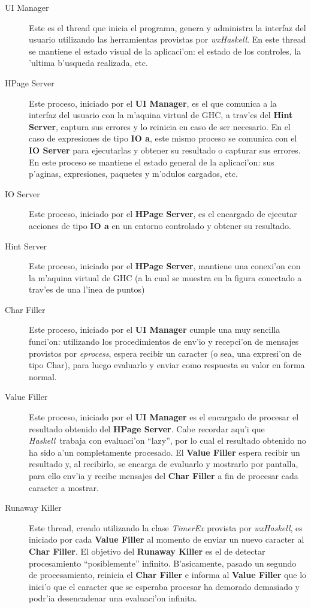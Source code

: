 \documentclass[a4paper]{article}
\newcommand{\haskell}{\textsl{Haskell}}
\begin{document}
\begin{description}
	\item[UI Manager] Este es el thread que inicia el programa, genera y administra la interfaz del usuario utilizando las herramientas provistas por \textsl{wxHaskell}.  En este thread se mantiene el estado visual de la aplicaci'on: el estado de los controles, la 'ultima b'usqueda realizada, etc.
	\item[HPage Server] Este proceso, iniciado por el \textbf{UI Manager}, es el que comunica a la interfaz del usuario con la m'aquina virtual de GHC, a trav'es del \textbf{Hint Server}, captura sus errores y lo reinicia en caso de ser necesario.  En el caso de expresiones de tipo \textbf{IO a}, este mismo proceso se comunica con el \textbf{IO Server} para ejecutarlas y obtener su resultado o capturar sus errores.  En este proceso se mantiene el estado general de la aplicaci'on: sus p'aginas, expresiones, paquetes y m'odulos cargados, etc.
	\item[IO Server]Este proceso, iniciado por el  \textbf{HPage Server}, es el encargado de ejecutar acciones de tipo \textbf{IO a} en un entorno controlado y obtener su resultado.
	\item[Hint Server] Este proceso, iniciado por el \textbf{HPage Server}, mantiene una conexi'on con la m'aquina virtual de GHC (a la cual se muestra en la figura conectado a trav'es de una l'inea de puntos)
	\item[Char Filler] Este proceso, iniciado por el \textbf{UI Manager} cumple una muy sencilla funci'on: utilizando los procedimientos de env'io y recepci'on de mensajes provistos por \textsl{eprocess}, espera recibir un caracter (o sea, una expresi'on de tipo Char), para luego evaluarlo y enviar como respuesta su valor en forma normal.
	\item[Value Filler] Este proceso, iniciado por el \textbf{UI Manager} es el encargado de procesar el resultado obtenido del \textbf{HPage Server}.  Cabe recordar aqu'i que \haskell\ trabaja con evaluaci'on ``lazy'', por lo cual el resultado obtenido no ha sido a'un completamente procesado.  El \textbf{Value Filler} espera recibir un resultado y, al recibirlo, se encarga de evaluarlo y mostrarlo por pantalla, para ello env'ia y recibe mensajes del \textbf{Char Filler} a fin de procesar cada caracter a mostrar.
	\item[Runaway Killer] Este thread, creado utilizando la clase \textsl{TimerEx} provista por \textsl{wxHaskell}, es iniciado por cada \textbf{Value Filler} al momento de enviar un nuevo caracter al \textbf{Char Filler}.  El objetivo del \textbf{Runaway Killer} es el de detectar procesamiento ``posiblemente'' infinito.  B'asicamente, pasado un segundo de procesamiento, reinicia el \textbf{Char Filler} e informa al \textbf{Value Filler} que lo inici'o que el caracter que se esperaba procesar ha demorado demasiado y podr'ia desencadenar una evaluaci'on infinita.
\end{description}
\end{document}
